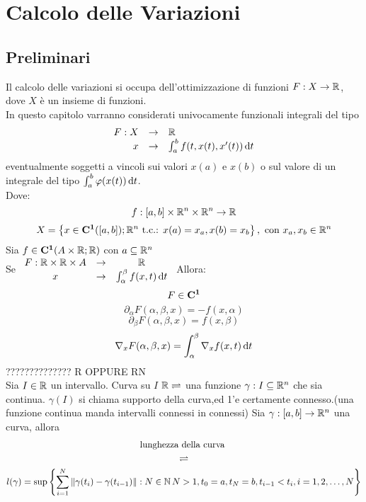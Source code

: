 \chapter{Calcolo delle Variazioni}
\newpage
\section{Preliminari}
Il calcolo delle variazioni si occupa dell'ottimizzazione di funzioni $ F : X \to \mathbb{R} $, dove $X$ è un insieme di funzioni.\\
In questo capitolo varranno considerati univocamente funzionali integrali del tipo
\[\begin{array}{rcl} F: X & \to & \mathbb{R} \\
x & \to & \int_{a}^b f(t,x(t), x'(t))\,\mathrm{d}{t}\end{array}\]
eventualmente soggetti a vincoli sui valori $x(a)$ e $x(b)$ o sul valore di un integrale del tipo $\int_a^b \varphi(x(t))\,\mathrm{d}{t}$.\\
Dove:
\[f: \left[a,b\right]\times \mathbb{R} ^n\times \mathbb{R} ^n \to \mathbb{R}\]
\[X=\left\{x\in \mathbf{C^{1}}(\left[a,b\right]); \mathbb{R} ^n\text{ t.c.: }x(a)=x_a, x(b)=x_b \right\},\text{ con }x_a,x_b\in \mathbb{R} ^n\]
\proposition
Sia $f\in \mathbf{C^{1}}(A\times \mathbb{R} ; \mathbb{R} )$ con $a\subseteq \mathbb{R} ^n$\\
Se $\begin{array}{ccc} F: \mathbb{R} \times \mathbb{R} \times A & \to & \mathbb{R} \\
x & \to & \int_{\alpha}^\beta f(x,t)\,\mathrm{d}{t}\end{array}$
Allora:
\[ F\in \mathbf{C^{1}}\]
\[ \partial_\alpha F(\alpha,\beta,x)=-f(x,\alpha)\]
\[ \partial_\beta F(\alpha,\beta,x)=f(x,\beta)\]
\[ \nabla_x F(\alpha,\beta,x)=\int_{\alpha}^{\beta}\nabla_xf(x,t)\,\mathrm{d}{t}\]
 ?????????????? R OPPURE RN\\
Sia $I\in \mathbb{R} $ un intervallo. Curva su $I$ $ \mathbb{R} \rightleftharpoons$ una funzione $\gamma:I\subseteq \mathbb{R} ^n$ che sia continua.
\observation
$\gamma(I)$ si chiama supporto della curva,ed 1'e certamente connesso.(una funzione continua manda intervalli connessi in connessi)
Sia $\gamma : \left[a,b\right] \to \mathbb{R}^n$ una curva, allora
\[
	\begin{gathered}
		\text{lunghezza della curva }\\
		\rightleftharpoons\\
		l(\gamma)=\sup\left\{\sum\limits_{i=1}^{N}\left\|\gamma(t_i)-\gamma(t_{i-1})\right\|: N\in\mathbb{N}\,N>1,t_0=a,t_N=b,t_{i-1}<t_i, i=1,2,\ldots,N\right\}
	\end{gathered}
\]
